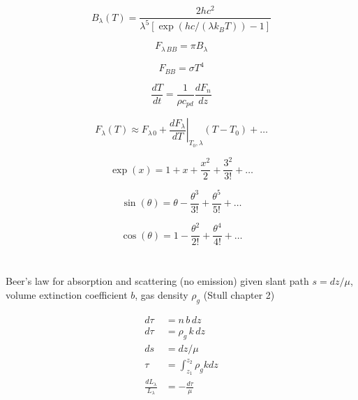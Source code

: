 \documentclass[12pt]{article}
\begin{document}
\begin{multicols}{2}
\begin{equation}
  \label{eq:black2}
B_\lambda(T)=\frac{2 h c^2}{\lambda^5\left[\exp \left(h c /\left(\lambda k_B T\right)\right)-1\right]}
\end{equation}

\begin{equation}
  \label{eq:pi}
  F_{\lambda\,BB} = \pi B_\lambda
\end{equation}

\begin{equation}
  \label{eq:stefan}
  F_{BB}=\sigma T^4
\end{equation}

\begin{equation}
  \label{eq:fluxdiv}
  \frac{dT}{dt} = \frac{1}{\rho c_{pd}} \frac{dF_n}{dz}
\end{equation}


\begin{equation}
  \label{eq:taylor}
  F_\lambda(T) \approx F_{\lambda\, 0} + \left .\frac{dF_\lambda}{dT}  \right |_{T_0,\lambda} \!\!\! (T - T_0) + \ldots
\end{equation}

\begin{equation}
  \label{eq:exp}
  \exp(x) = 1 + x +  \frac{x^2}{2} + \frac{3^2}{3!} + \ldots
\end{equation}

\begin{equation}
  \sin(\theta) = \theta - \frac{\theta^3}{3!} + \frac{\theta^5}{5!} + \ldots
\end{equation}

\begin{equation}
  \cos(\theta) = 1 -  \frac{\theta^2}{2!} + \frac{\theta^4}{4!} + \ldots
\end{equation}

$~$

\vspace{0.5in}




\noindent

$~$

\noindent
Beer's law for absorption and scattering (no emission) given
slant path $s= dz/\mu$, volume extinction coefficient $b$,
gas density $\rho_g$ (Stull chapter 2)

\begin{align}
  d\tau &= n\,b\,dz \\
  d\tau &= \rho_g\,k\,dz \\
  ds &= dz/\mu \\
  \tau & = \int_{z_1}^{z_2} \rho_g k dz \\
\frac{dL_\lambda}{L_\lambda}  & =  - \frac{d\tau}{\mu} 
\end{align}               



\end{multicols}
\end{document}
